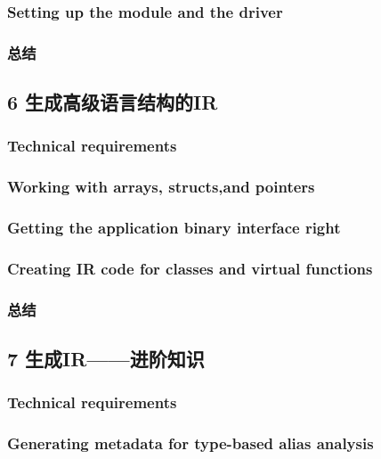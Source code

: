 \documentclass[11pt,a4paper,UTF8]{ctexart}
\begin{document}
		\subsubsection{Setting up the module and the driver}
		\subsubsection{总结}
	\subsection{6 生成高级语言结构的IR}
		\subsubsection{Technical requirements}
		\subsubsection{Working with arrays, structs,and pointers}
		\subsubsection{Getting the application binary interface right}
		\subsubsection{Creating IR code for classes and virtual functions}
		\subsubsection{总结}
	\subsection{7 生成IR——进阶知识}
		\subsubsection{Technical requirements}
		\subsubsection{Generating metadata for type-based alias analysis}
\end{document}
